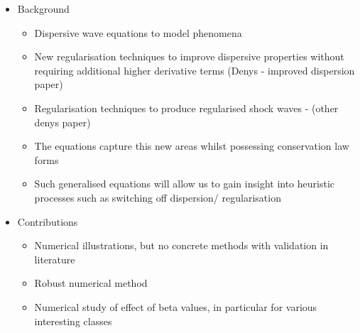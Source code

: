 \documentclass[10pt]{elsarticle}
\begin{document}
\begin{itemize}
	\item Background
	\begin{itemize}
		\item Dispersive wave equations to model phenomena
		\item New regularisation techniques to improve dispersive properties without requiring additional higher derivative terms (Denys - improved dispersion paper)
		\item Regularisation techniques to produce regularised shock waves - (other denys paper)
		\item The equations capture this new areas whilst possessing conservation law forms
		\item Such generalised equations will allow us to gain insight into heuristic processes such as switching off dispersion/ regularisation
	\end{itemize}
\item Contributions
\begin{itemize}
	\item Numerical illustrations, but no concrete methods with validation in literature
	\item Robust numerical method
	\item Numerical study of effect of beta values, in particular for various interesting classes
\end{itemize}
\end{itemize}



\end{document}
